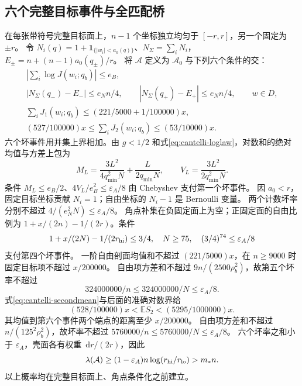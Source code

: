 \documentclass[UTF8,a4paper,11pt,fontset=fandol]{ctexart}
\theoremstyle{remark}
\newcommand{\one}{\mathbf 1}
\newcommand{\dint}{\,\mathrm d}
\begin{document}
\subsection{六个完整目标事件与全匹配桥}\label{subsec:cantelli-target}
在每张带符号完整目标面上，$n-1$ 个坐标独立均匀于 $[-r,r]$，另一个固定为 $\pm r$。
令 $N_i(q)=1+\one_{\{|w_i|<a_0(q)\}}$、$N_\Sigma=\sum_iN_i$，
$E_\pm=n+(n-1)a_0(q_\pm)/r$。
将 $\mathcal A$ 定义为 $\mathcal A_0$ 与下列六个条件的交：
\begin{equation}\label{eq:cantelli-six}
\begin{gathered}
 \left|\sum_i\log J(w_i;q_b)\right|\le e_B,\\
 |N_\Sigma(q_-)-E_-|\le e_Nn/4,\qquad
 |N_\Sigma(q_+)-E_+|\le e_Nn/4,\qquad w\in D,\\
 \sum_iJ_1(w_i;q_b)\le(221/5000+1/100000)x,\\
 (527/100000)x\le\sum_iJ_2(w_i;q_b)\le(53/10000)x.
\end{gathered}
\end{equation}
六个坏事件用并集上界相加。由 $g<1/2$ 和式\eqref{eq:cantelli-loglaw}，对数和的绝对均值与方差上包为
\[
 M_L=\frac{3L^2}{4q_{\min}^2N}+\frac{L}{2q_{\min}N},\qquad
 V_L=\frac{3L^2}{2q_{\min}^2N}.
\]
条件 $M_L\le e_B/2$、$4V_L/e_B^2\le\varepsilon_A/8$ 由 Chebyshev 支付第一个坏事件。
因 $a_0<r$，固定目标坐标贡献 $N_i=1$；自由坐标的 $N_i-1$ 是 Bernoulli 变量。
两个计数坏率分别不超过 $4/(e_N^2N)\le\varepsilon_A/8$。
角点补集在负固定面上为空；正固定面的自由比例为
$1+x/(2n)-1/(2r)$。条件
\[
 1+x/(2N)-1/(2r_{\rm hi})\le3/4,\quad
 N\ge75,\quad (3/4)^{74}\le\varepsilon_A/8
\]
支付第四个坏事件。
一阶自由剖面均值和不超过 $(221/5000)x$，在 $n\ge9000$ 时固定目标项不超过 $x/200000$。
自由项方差和不超过 $9n/(2500\rho_b^2)$，故第五个坏率不超过
\[
 324000000/n\le324000000/N\le\varepsilon_A/8.
\]
式\eqref{eq:cantelli-secondmean}与后面的准确对数界给
\[
 (528/100000)x<\mathbb ES_2<(5295/1000000)x.
\]
其均值到第六个事件两个端点的距离至少 $x/200000$。
自由项方差和不超过 $n/(125^2\rho_b^2)$，故坏率不超过
$5760000/n\le5760000/N\le\varepsilon_A/8$。
六个坏率之和小于 $\varepsilon_A$，壳面各有权重 $\dint r/(2r)$，因此
\begin{equation}\label{eq:cantelli-mass}
 \lambda(\mathcal A)\ge(1-\varepsilon_A)n\log(r_{\rm hi}/r_{\rm lo})>m_*n.
\end{equation}
以上概率均在完整目标面上、角点条件化之前建立。
\end{document}
